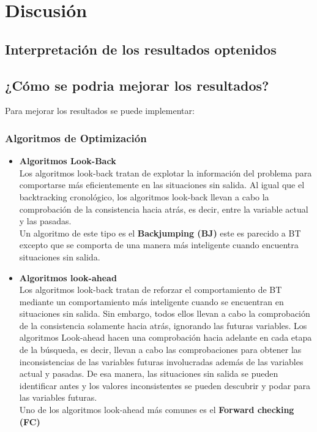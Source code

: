 \documentclass[a4paper]{article}
\begin{document}
\pagebreak
\section{Discusi\'on}
\subsection{Interpretaci\'on de los resultados optenidos}

\subsection{¿C\'omo se podria mejorar los resultados?}

Para mejorar los resultados se puede implementar:
\subsubsection{Algoritmos de Optimización}
\begin{itemize}
\item \textbf{Algoritmos Look-Back}\\
Los algoritmos look-back tratan de explotar la información del problema para comportarse más eficientemente en las situaciones sin salida. Al igual que el backtracking cronológico, los algoritmos look-back llevan a cabo la comprobación de la consistencia hacia atrás, es decir, entre la variable actual y las pasadas.\\
Un algoritmo de este tipo es el \textbf{Backjumping (BJ)} este es parecido a BT excepto que se comporta de una manera más inteligente cuando encuentra situaciones sin salida.

\item \textbf{Algoritmos look-ahead}\\
Los algoritmos look-back tratan de reforzar el comportamiento de BT mediante un comportamiento más inteligente cuando se encuentran en situaciones sin salida. Sin embargo, todos ellos llevan a cabo la comprobación de la consistencia solamente hacia atrás, ignorando las futuras variables. Los algoritmos Look-ahead hacen una comprobación hacia adelante en cada etapa de la búsqueda, es decir, llevan a cabo las comprobaciones para obtener las inconsistencias de las variables futuras involucradas además de las variables actual y pasadas. De esa manera, las situaciones sin salida se pueden identificar antes y los valores inconsistentes se pueden descubrir y podar para las variables futuras.\\
Uno de los algoritmos look-ahead más comunes es el \textbf{Forward checking (FC)} 

\end{itemize}
\end{document}
